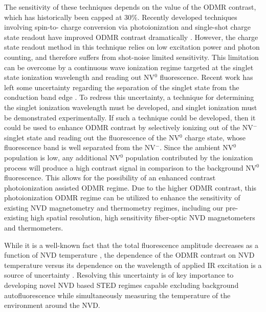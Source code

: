\documentclass[11pt]{article}
\begin{document}
The sensitivity of these techniques depends on the value of the ODMR contrast, which
has historically been capped at 30\%. Recently developed techniques involving spin-to- charge
conversion via photoionization and single-shot charge state readout have improved ODMR
contrast dramatically \cite{Shields2015}. However, the charge state readout method in this technique relies on
low excitation power and photon counting, and therefore suffers from shot-noise limited
sensitivity. This limitation can be overcome by a continuous wave ionization regime targeted at
the singlet state ionization wavelength and reading out NV$^0$ fluorescence. Recent work has left
some uncertainty regarding the separation of the singlet state from the conduction band edge \cite{Toyli2012,Goldman2015,Goldman2015a}. 
To redress this uncertainty, a technique for determining the singlet ionization wavelength
must be developed, and singlet ionization must be demonstrated experimentally.  If such a technique could be developed, then it could be used to enhance ODMR contrast by selectively ionizing out of the NV$^-$ singlet state and reading out the fluorescence of the NV$^0$ charge state, whose fluorescence band is well separated from the NV$^-$.  Since the ambient NV$^0$ population is low, any additional NV$^0$ population contributed by the ionization process will produce a high contrast signal in comparison to the background NV$^0$ fluorescence.  This allows for the possibility of an enhanced contrast photoionization assisted ODMR regime.  Due to the higher ODMR contrast, this photoionization ODMR regime can be utilized to enhance the sensitivity of existing NVD magnetometry \cite{Blakley2016a,Blakley2015,Fedotov2014a,Fedotov2014c,Fedotov2014,Fedotov2016} and thermometry \cite{Fedotov2014b,Blakley2016} regimes, including our pre-existing high spatial resolution, high sensitivity fiber-optic NVD magnetometers and thermometers.

While it is a well-known fact that the total fluorescence amplitude decreases as a function of NVD temperature \cite{Lai2013}, the dependence of the ODMR 
contrast on NVD temperature versus its dependence on the wavelength of applied IR excitation is a source of uncertainty \cite{Blakley2016}.  Resolving this 
uncertainty is of key importance to developing novel NVD based STED regimes capable excluding background autofluorescence while simultaneously 
measuring the temperature of the environment around the NVD.
\end{document}
